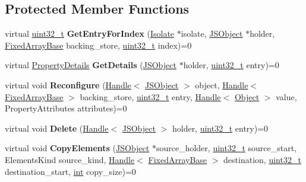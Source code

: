 \subsection*{Protected Member Functions}
\begin{DoxyCompactItemize}
\item 
\mbox{\label{classv8_1_1internal_1_1ElementsAccessor_a5fe1cc98006d69922e58e1c25981c253}} 
virtual \mbox{\hyperlink{classuint32__t}{uint32\+\_\+t}} {\bfseries Get\+Entry\+For\+Index} (\mbox{\hyperlink{classv8_1_1internal_1_1Isolate}{Isolate}} $\ast$isolate, \mbox{\hyperlink{classv8_1_1internal_1_1JSObject}{J\+S\+Object}} $\ast$holder, \mbox{\hyperlink{classv8_1_1internal_1_1FixedArrayBase}{Fixed\+Array\+Base}} backing\+\_\+store, \mbox{\hyperlink{classuint32__t}{uint32\+\_\+t}} index)=0
\item 
\mbox{\label{classv8_1_1internal_1_1ElementsAccessor_a8dd4fc7621761fb78bef5a5092f2214e}} 
virtual \mbox{\hyperlink{classv8_1_1internal_1_1PropertyDetails}{Property\+Details}} {\bfseries Get\+Details} (\mbox{\hyperlink{classv8_1_1internal_1_1JSObject}{J\+S\+Object}} $\ast$holder, \mbox{\hyperlink{classuint32__t}{uint32\+\_\+t}} entry)=0
\item 
\mbox{\label{classv8_1_1internal_1_1ElementsAccessor_a28bc83b75e7112aed2df0e1cc78330f9}} 
virtual void {\bfseries Reconfigure} (\mbox{\hyperlink{classv8_1_1internal_1_1Handle}{Handle}}$<$ \mbox{\hyperlink{classv8_1_1internal_1_1JSObject}{J\+S\+Object}} $>$ object, \mbox{\hyperlink{classv8_1_1internal_1_1Handle}{Handle}}$<$ \mbox{\hyperlink{classv8_1_1internal_1_1FixedArrayBase}{Fixed\+Array\+Base}} $>$ backing\+\_\+store, \mbox{\hyperlink{classuint32__t}{uint32\+\_\+t}} entry, \mbox{\hyperlink{classv8_1_1internal_1_1Handle}{Handle}}$<$ \mbox{\hyperlink{classv8_1_1internal_1_1Object}{Object}} $>$ value, Property\+Attributes attributes)=0
\item 
\mbox{\label{classv8_1_1internal_1_1ElementsAccessor_a8d3fe7d116744f4717a0338469f4555a}} 
virtual void {\bfseries Delete} (\mbox{\hyperlink{classv8_1_1internal_1_1Handle}{Handle}}$<$ \mbox{\hyperlink{classv8_1_1internal_1_1JSObject}{J\+S\+Object}} $>$ holder, \mbox{\hyperlink{classuint32__t}{uint32\+\_\+t}} entry)=0
\item 
\mbox{\label{classv8_1_1internal_1_1ElementsAccessor_abb137b592fd9ed5338425d843b41188f}} 
virtual void {\bfseries Copy\+Elements} (\mbox{\hyperlink{classv8_1_1internal_1_1JSObject}{J\+S\+Object}} $\ast$source\+\_\+holder, \mbox{\hyperlink{classuint32__t}{uint32\+\_\+t}} source\+\_\+start, Elements\+Kind source\+\_\+kind, \mbox{\hyperlink{classv8_1_1internal_1_1Handle}{Handle}}$<$ \mbox{\hyperlink{classv8_1_1internal_1_1FixedArrayBase}{Fixed\+Array\+Base}} $>$ destination, \mbox{\hyperlink{classuint32__t}{uint32\+\_\+t}} destination\+\_\+start, \mbox{\hyperlink{classint}{int}} copy\+\_\+size)=0
\end{DoxyCompactItemize}
